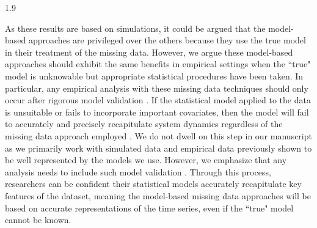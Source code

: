 \documentclass[12pt,english]{article} %
\begin{document}
\begin{linenumbers}
\begin{spacing}{1.9}
\begin{flushleft}
\hspace{1em} As these results are based on simulations, it could be argued that the model-based approaches are privileged over the others because they use the true model in their treatment of the missing data. However, we argue these model-based approaches should exhibit the same benefits in empirical settings when the ``true" model is unknowable but appropriate statistical procedures have been taken. In particular, any empirical analysis with these missing data techniques should only occur after rigorous model validation \citep{yates2023cross}. If the statistical model applied to the data is unsuitable or fails to incorporate important covariates, then the model will fail to accurately and precisely recapitulate system dynamics regardless of the missing data approach employed \citep{mac2018model}. We do not dwell on this step in our manuscript as we primarily work with simulated data and empirical data previously shown to be well represented by the models we use. However, we emphasize that any analysis needs to include such model validation \citep{tredennick_practical_nodate}. Through this process, researchers can be confident their statistical models accurately recapitulate key features of the dataset, meaning the model-based missing data approaches will be based on accurate representations of the time series, even if the ``true" model cannot be known. 



\end{flushleft}
\end{spacing}
\end{linenumbers}
\end{document}
